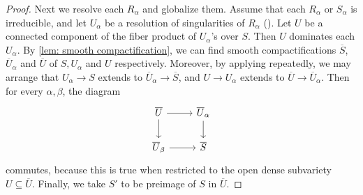 \documentclass[11pt, letterpaper]{amsart}
\theoremstyle{plain}
\theoremstyle{definition}
\newcommand{\<}{\langle}
\renewcommand{\>}{\rangle}
\begin{document}
\begin{proof}
    Next we resolve each $R_\alpha$ and globalize them.
    Assume that each $R_\alpha$ or $S_\alpha$ is irreducible, and let $U_\alpha$ be a resolution of singularities of $R_\alpha$ (\cite[\href{https://stacks.math.columbia.edu/tag/0BGP}{Tag 0BGP}]{stacks-project}).
    Let $U$ be a connected component of the fiber product of $U_\alpha$'s over $S$. 
    Then $U$ dominates each $U_\alpha$.
    By \cref{lem: smooth compactification}, we can find smooth compactifications $\overline{S}$, $\overline{U}_\alpha$ and $\overline{U}$ of $S, U_\alpha$ and $U$ respectively. Moreover, by applying \cite[\href{https://stacks.math.columbia.edu/tag/0C5H}{Tag 0C5H}]{stacks-project} repeatedly, we may arrange that $U_\alpha \to S$ extends to $\overline{U}_\alpha \to \overline{S}$, and $U \to U_\alpha$ extends to $\overline{U} \to \overline{U}_\alpha$.
    Then for every $\alpha, \beta$, the diagram
    \begin{equation}
        \begin{tikzcd}
	\overline{U} & {\overline{U}_\alpha} \\
	{\overline{U}_\beta} & {\overline{S}}
	\arrow[from=1-1, to=1-2]
	\arrow[from=1-1, to=2-1]
	\arrow[from=1-2, to=2-2]
	\arrow[from=2-1, to=2-2]
        \end{tikzcd}
    \end{equation}
commutes, because this is true when restricted to the open dense subvariety $U \subseteq \overline{U}$. 
Finally, we take $S'$ to be preimage of $S$ in $\overline{U}$. 
\end{proof}
\end{document}
